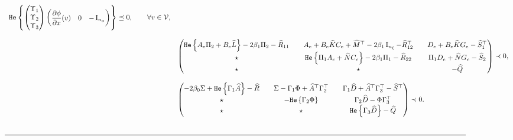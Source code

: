 \documentclass{ifacconf}
\begin{document}
\begin{figure*}
\begin{equation}
\begin{array}{rl}
         \texttt{\relax{He}}\left\{{\left(\begin{matrix}\Upsilon_1\\\Upsilon_2\\\Upsilon_3\end{matrix}\right)\left(\begin{matrix}\dfrac{\partial \phi}{\partial x}(v)& 0 & -\operatorname{I}_{n_x}\end{matrix}\right)}\right\}\preceq 0 , \qquad \forall v \in {\mathcal{V}},
        \\&\\
           & \left(\begin{matrix}
   \texttt{\relax{He}}\left\{{A_e \Pi_2+B_e \widehat L}\right\} -2\beta_1 \Pi_2 - \widehat R_{11} && A_e+B_e \widehat K C_e  + \widehat M^\top-2\beta_1 \operatorname{I}_{n_\xi} -  \widehat R_{12}^\top && D_e +B_e \widehat K G_e -  \widehat S_1^\top\\
   \star && \texttt{\relax{He}}\left\{{ \Pi_1 A_e +  \widehat N  C_e }\right\} -2\beta_1 \Pi_1   -\widehat R_{22}&& \Pi_1 D_e  + \widehat N G_e -\widehat S_2\\
   \star &&\star&& - \widehat Q
    \end{matrix}\right)\prec 0,\\&\\
         &\left(\begin{matrix}
    -2\beta_0 \Sigma+ \texttt{\relax{He}}\left\{{\Gamma_1 \widehat A}\right\} - \widehat R & & \Sigma- \Gamma_1 \Phi+ \widehat A^\top \Gamma_2^\top  &  &\Gamma_1 \widehat D +  \widehat A^\top \Gamma_3^\top - \widehat S^\top\\
    \star  && -\texttt{\relax{He}}\left\{{\Gamma_2 \Phi}\right\}  & &\Gamma_2 \widehat D -\Phi\Gamma_3^\top \\
    \star && \star& &\texttt{\relax{He}}\left\{{\Gamma_3 \widehat D}\right\} - \widehat Q
    \end{matrix}\right)\prec 0  .\\&\\
    \end{array}    
    \end{equation}
    \hrule
\end{figure*}
\end{document}
